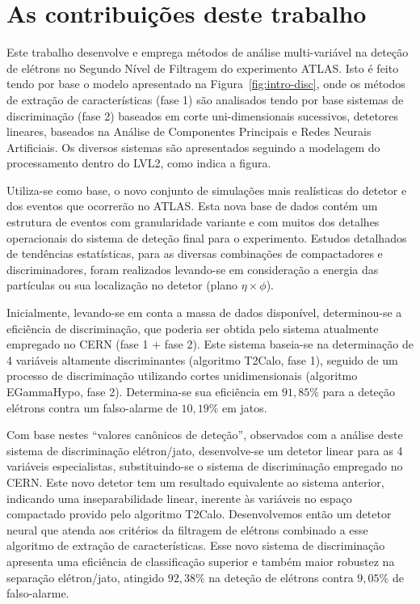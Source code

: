 \section{As contribuições deste trabalho}

Este trabalho desenvolve e emprega métodos de análise multi-variável na
deteção de elétrons no Segundo Nível de Filtragem do experimento ATLAS. Isto é
feito tendo por base o modelo apresentado na Figura~\ref{fig:intro-disc}, onde
os métodos de extração de características (fase 1) são analisados tendo por
base sistemas de discriminação (fase 2) baseados em corte uni-dimensionais
sucessivos, detetores lineares, baseados na Análise de Componentes Principais
e Redes Neurais Artificiais. Os diversos sistemas são apresentados seguindo a
modelagem do processamento dentro do LVL2, como indica a figura.

Utiliza-se como base, o novo conjunto de simulações mais realísticas do
detetor e dos eventos que ocorrerão no ATLAS. Esta nova base de dados contém
um estrutura de eventos com granularidade variante e com muitos dos detalhes
operacionais do sistema de deteção final para o experimento. Estudos
detalhados de tendências estatísticas, para as diversas combinações de
compactadores e discriminadores, foram realizados levando-se em consideração a
energia das partículas ou sua localização no detetor (plano $\eta\times\phi$).

Inicialmente, levando-se em conta a massa de dados disponível, determinou-se a
eficiência de discriminação, que poderia ser obtida pelo sistema atualmente
empregado no CERN (fase 1 $+$ fase 2). Este sistema baseia-se na determinação
de 4 variáveis altamente discriminantes (algoritmo T2Calo, fase 1), seguido de
um processo de discriminação utilizando cortes unidimensionais (algoritmo
EGammaHypo, fase 2). Determina-se sua eficiência em $91,85\%$ para a deteção
elétrons contra um falso-alarme de $10,19\%$ em jatos.

Com base nestes ``valores canônicos de deteção'', observados com a análise
deste sistema de discriminação elétron/jato, desenvolve-se um detetor linear
para as 4 variáveis especialistas, substituindo-se o sistema de discriminação
 empregado no CERN. Este novo detetor tem um resultado
equivalente ao sistema anterior, indicando uma inseparabilidade linear,
inerente às variáveis no espaço compactado provido pelo algoritmo
T2Calo. Desenvolvemos então um detetor neural que atenda aos critérios da
filtragem de elétrons combinado a esse algoritmo de extração de
características. Esse novo sistema de discriminação apresenta uma eficiência
de classificação superior e também maior robustez na separação elétron/jato,
atingido $92,38\%$ na deteção de elétrons contra $9,05\%$ de falso-alarme.


